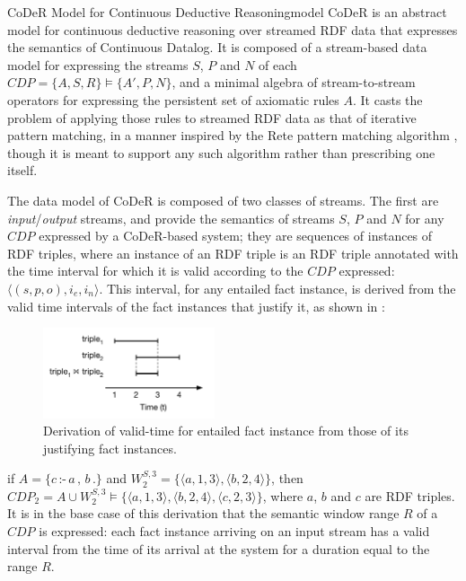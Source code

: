 \begin{nestedsection}{CoDeR Model for Continuous Deductive Reasoning}{model}
	CoDeR is an abstract model for continuous deductive reasoning over streamed RDF data that expresses the semantics of Continuous Datalog.
	It is composed of a stream-based data model for expressing the streams $S$, $P$ and $N$ of each ${CDP = \{A,S,R\} \vDash \{A',P,N\}}$, and a minimal algebra of stream-to-stream operators for expressing the persistent set of axiomatic rules $A$.
	It casts the problem of applying those rules to streamed RDF data as that of iterative pattern matching, in a manner inspired by the Rete pattern matching algorithm \citep{forgy79}, though it is meant to support any such algorithm rather than prescribing one itself.

	The data model of CoDeR is composed of two classes of streams.
	The first are \emph{input}/\emph{output} streams, and provide the semantics of streams $S$, $P$ and $N$ for any ${CDP}$ expressed by a CoDeR-based system;
	they are sequences of instances of RDF triples, where an instance of an RDF triple is an RDF triple annotated with the time interval for which it is valid \citep{SemanticStreamingManagement,sparkwave} according to the ${CDP}$ expressed: ${\langle (s,p,o),i_{e},i_{n} \rangle}$.
	This interval, for any entailed fact instance, is derived from the valid time intervals of the fact instances that justify it, as shown in :
	\begin{figure}[t]
		\centering
		\includegraphics[width=0.45\textwidth]{intersected-intervals}
		\caption{Derivation of valid-time for entailed fact instance from those of its justifying fact instances.}
	\end{figure}
	if ${A = \{c\,\text{:-}\,a\,,\,b\,.\}}$ and ${W^{S,3}_{2} = \{ \langle a,1,3 \rangle , \langle b,2,4 \rangle \}}$, then ${CDP_{2} = A \cup W^{S,3}_{2} \vDash \{ \langle a,1,3 \rangle , \langle b,2,4 \rangle , \langle c,2,3 \rangle \}}$, where $a$, $b$ and $c$ are RDF triples.
	It is in the base case of this derivation that the semantic window range $R$ of a ${CDP}$ is expressed:
	each fact instance arriving on an input stream has a valid interval from the time of its arrival at the system for a duration equal to the range $R$.


\end{nestedsection}
